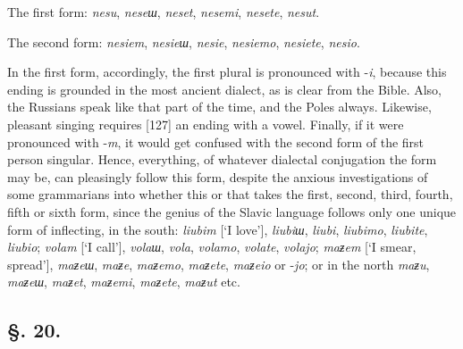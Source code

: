 The first form: \textit{nesu}, \textit{neseш}, \textit{neset}, \textit{nesemi}, \textit{nesete}, \textit{nesut}.

The second form: \textit{nesiem}, \textit{nesieш}, \textit{nesie}, \textit{nesiemo}, \textit{nesiete}, \textit{nesio}.

In the first form, accordingly, the first plural is pronounced with -\textit{i}, because this ending is grounded in the most ancient dialect, as is clear from the Bible. Also, the Russians speak like that part of the time, and the Poles always. Likewise, pleasant singing requires [127] an ending with a vowel. Finally, if it were pronounced with -\textit{m}, it would get confused with the second form of the first person singular. Hence, everything, of whatever dialectal conjugation the form may be, can pleasingly follow this form, despite the anxious investigations of some grammarians into whether this or that takes the first, second, third, fourth, fifth or sixth form, since the genius of the Slavic language follows only one unique form of inflecting, in the south: \textit{liubim} [‘I love’], \textit{liubiш}, \textit{liubi}, \textit{liubimo}, \textit{liubite}, \textit{liubio}; \textit{volam} [‘I call’], \textit{volaш}, \textit{vola}, \textit{volamo}, \textit{volate}, \textit{volajo}; \textit{maƶem} [‘I smear, spread’], \textit{maƶeш}, \textit{maƶe}, \textit{maƶemo}, \textit{maƶete}, \textit{maƶeio} or -\textit{jo}; or in the north \textit{maƶu}, \textit{maƶeш}, \textit{maƶet}, \textit{maƶemi}, \textit{maƶete}, \textit{maƶut} etc.

\subsection*{\hspace*{\fill}§. 20.\hspace*{\fill}}

